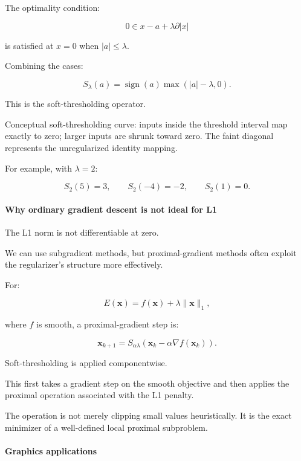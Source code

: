 The optimality condition:

\[
0\in x-a+\lambda\partial|x|
\]

is satisfied at \(x=0\) when \(|a|\le\lambda\).

Combining the cases:

\[
\boxed{ S_\lambda(a)= \operatorname{sign}(a) \max(|a|-\lambda,0) }.
\]

This is the soft-thresholding operator.

Conceptual soft-thresholding curve: inputs inside the threshold interval map exactly to zero; larger inputs are shrunk toward zero. The faint diagonal represents the unregularized identity mapping.

For example, with \(\lambda=2\):

\[
S_2(5)=3,\qquad S_2(-4)=-2,\qquad S_2(1)=0.
\]

\paragraph{Why ordinary gradient descent is not ideal for L1}\label{02-foundations-ii-ch027-why-ordinary-gradient-descent-is-not-ideal-for-l1}

\hypertarget{02-foundations-ii-ch027-why-ordinary-gradient-descent-is-not-ideal-for-l1}{}

The L1 norm is not differentiable at zero.

We can use subgradient methods, but proximal-gradient methods often exploit the regularizer's structure more effectively.

For:

\[
E(\mathbf x)=f(\mathbf x)+\lambda\|\mathbf x\|_1,
\]

where \(f\) is smooth, a proximal-gradient step is:

\[
\boxed{ \mathbf x_{k+1} = S_{\alpha\lambda} \left( \mathbf x_k-\alpha\nabla f(\mathbf x_k) \right) }.
\]

Soft-thresholding is applied componentwise.

This first takes a gradient step on the smooth objective and then applies the proximal operation associated with the L1 penalty.

The operation is not merely clipping small values heuristically. It is the exact minimizer of a well-defined local proximal subproblem.

\paragraph{Graphics applications}\label{02-foundations-ii-ch027-graphics-applications}

